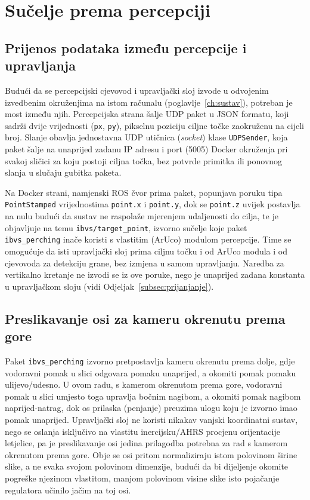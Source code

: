 \section{Sučelje prema percepciji}
\label{sec:sucelje-percepcija}

\subsection{Prijenos podataka između percepcije i upravljanja}
\label{subsec:udp-most}

Budući da se percepcijski cjevovod i upravljački sloj izvode u odvojenim izvedbenim okruženjima na istom računalu (poglavlje~\ref{ch:sustav}), potreban je most između njih. Percepcijska strana šalje UDP paket u JSON formatu, koji sadrži dvije vrijednosti (\texttt{px}, \texttt{py}), pikselnu poziciju ciljne točke zaokruženu na cijeli broj. Slanje obavlja jednostavna UDP utičnica (\emph{socket}) klase \texttt{UDPSender}, koja paket šalje na unaprijed zadanu IP adresu i port (5005) Docker okruženja pri svakoj sličici za koju postoji ciljna točka, bez potvrde primitka ili ponovnog slanja u slučaju gubitka paketa.

Na Docker strani, namjenski ROS čvor prima paket, popunjava poruku tipa \texttt{PointStamped} vrijednostima \texttt{point.x} i \texttt{point.y}, dok se \texttt{point.z} uvijek postavlja na nulu budući da sustav ne raspolaže mjerenjem udaljenosti do cilja, te je objavljuje na temu \texttt{ibvs/target\_point}, izvorno sučelje koje paket \texttt{ibvs\_perching} inače koristi s vlastitim (ArUco) modulom percepcije. Time se omogućuje da isti upravljački sloj prima ciljnu točku i od ArUco modula i od cjevovoda za detekciju grane, bez izmjena u samom upravljanju. Naredba za vertikalno kretanje ne izvodi se iz ove poruke, nego je unaprijed zadana konstanta u upravljačkom sloju (vidi Odjeljak~\ref{subsec:prijanjanje}).

\subsection{Preslikavanje osi za kameru okrenutu prema gore}
\label{subsec:preslikavanje-osi}


Paket \texttt{ibvs\_perching} izvorno pretpostavlja kameru okrenutu prema dolje, gdje vodoravni pomak u slici odgovara pomaku unaprijed, a okomiti pomak pomaku ulijevo/udesno. U ovom radu, s kamerom okrenutom prema gore, vodoravni pomak u slici umjesto toga upravlja bočnim nagibom, a okomiti pomak nagibom naprijed-natrag, dok os prilaska (penjanje) preuzima ulogu koju je izvorno imao pomak unaprijed. Upravljački sloj ne koristi nikakav vanjski koordinatni sustav, nego se oslanja isključivo na vlastitu inercijsku/AHRS procjenu orijentacije letjelice, pa je preslikavanje osi jedina prilagodba potrebna za rad s kamerom okrenutom prema gore. Obje se osi pritom normaliziraju istom polovinom širine slike, a ne svaka svojom polovinom dimenzije, budući da bi dijeljenje okomite pogreške njezinom vlastitom, manjom polovinom visine slike isto pojačanje regulatora učinilo jačim na toj osi.

